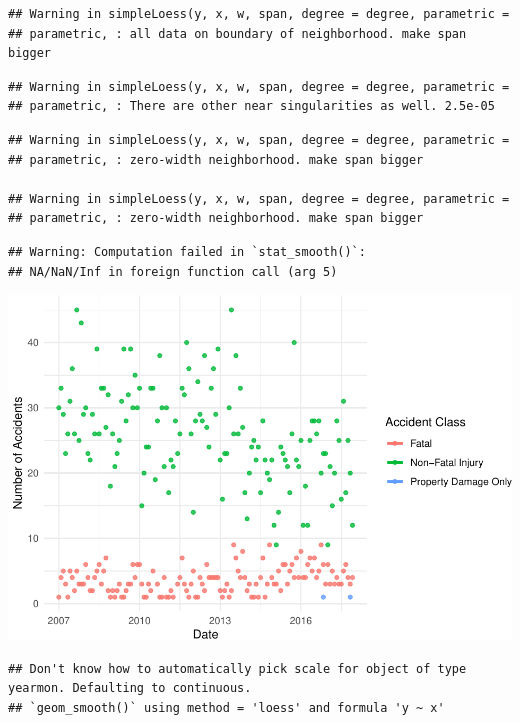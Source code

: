 \documentclass[]{article}
\begin{document}
\begin{verbatim}
## Warning in simpleLoess(y, x, w, span, degree = degree, parametric =
## parametric, : all data on boundary of neighborhood. make span bigger
\end{verbatim}

\begin{verbatim}
## Warning in simpleLoess(y, x, w, span, degree = degree, parametric =
## parametric, : There are other near singularities as well. 2.5e-05
\end{verbatim}

\begin{verbatim}
## Warning in simpleLoess(y, x, w, span, degree = degree, parametric =
## parametric, : zero-width neighborhood. make span bigger

## Warning in simpleLoess(y, x, w, span, degree = degree, parametric =
## parametric, : zero-width neighborhood. make span bigger
\end{verbatim}

\begin{verbatim}
## Warning: Computation failed in `stat_smooth()`:
## NA/NaN/Inf in foreign function call (arg 5)
\end{verbatim}

\includegraphics{Project_II-Final-20190404_files/figure-latex/unnamed-chunk-5-1.pdf}

\begin{verbatim}
## Don't know how to automatically pick scale for object of type yearmon. Defaulting to continuous.
## `geom_smooth()` using method = 'loess' and formula 'y ~ x'
\end{verbatim}
\end{document}
